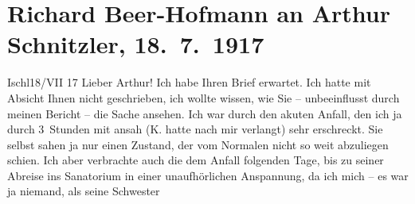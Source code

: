 

         
         \renewcommand{\erwaehntePersonen}{Personen: Arthur Kaufmann, Malvine Kaufmann, Rudolf Kaufmann, Olga Schnitzler, Heinrich Schnitzler, Lili Schnitzler}
         \renewcommand{\erwaehnteOrte}{Orte: Bad Ischl, Salzkammergut, Sanatorium Purkersdorf, Wien}
         \renewcommand{\erwaehnteWerke}{}
               \section[Richard Beer-Hofmann an Arthur Schnitzler, 18. 7. 1917]{ Richard Beer-Hofmann an Arthur Schnitzler, 18. 7. 1917}\nopagebreak{}\rehead{ }\begin{ledgroupsized}[t]{13cm}\normalsize\beginnumbering \toendnotes[C]{\smallbreak\pagebreak[2]} 
\toendnotes[C]{\smallbreak}\pstart
           \raggedleft{}{\pb}Ischl18/VII 17\pend
           \pstart
           Lieber Arthur! Ich habe Ihren Brief erwartet. Ich hatte mit Absicht
               Ihnen nicht geschrieben, ich wollte wissen, wie Sie – unbeeinflusst durch meinen
               Bericht – die Sache ansehen. Ich war durch den akuten Anfall, den ich ja durch
               3 Stunden mit ansah (K. hatte nach mir
               verlangt) sehr erschreckt. Sie selbst sahen ja nur einen Zustand, der vom Normalen
               nicht so weit abzuliegen schien. Ich aber verbrachte auch die dem Anfall folgenden
               Tage, bis zu seiner Abreise ins Sanatorium in einer unaufhörlichen Anspannung, da ich mich – es war ja
               niemand, als seine Schwester

\end{ledgroupsized}
